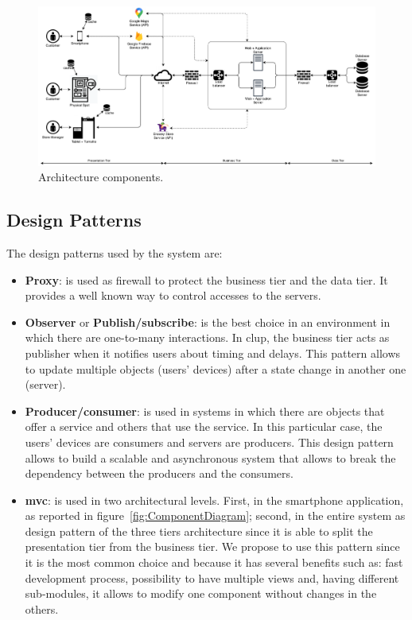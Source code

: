 \begin{figure}
	\centering
	\includegraphics[width=1.0\textwidth]{images/architecture_components.pdf}
	\caption{Architecture components.}\label{fig:ArchitectureComponents}
\end{figure}

\subsection{Design Patterns}

The design patterns used by the system are:
\begin{itemize}
	\item \textbf{Proxy}: is used as firewall to protect the business tier and the data tier. It provides a well known way to control accesses to the servers.
	\item \textbf{Observer} or \textbf{Publish/subscribe}: is the best choice in an environment in which there are one-to-many interactions. In \gls{clup}, the business tier acts as publisher when it notifies users about timing and delays. This pattern allows to update multiple objects (users' devices) after a state change in another one (server).
	\item \textbf{Producer/consumer}: is used in systems in which there are objects that offer a service and others that use the service. In this particular case, the users' devices are consumers and servers are producers. This design pattern allows to build a scalable and asynchronous system that allows to break the dependency between the producers and the consumers.
	\item \textbf{\gls{mvc}}: is used in two architectural levels. First, in the smartphone application, as reported in figure~\ref{fig:ComponentDiagram}; second, in the entire system as design pattern of the three tiers architecture since it is able to split the presentation tier from the business tier.
	We propose to use this pattern since it is the most common choice and because it has several benefits such as: fast development process, possibility to have multiple views and, having different sub-modules, it allows to modify one component without changes in the others.
\end{itemize}

